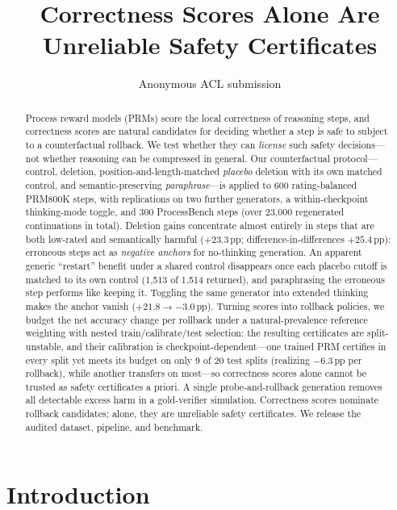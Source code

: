\documentclass[11pt]{article}
\title{Correctness Scores Alone Are Unreliable Safety Certificates}
\author{Anonymous ACL submission}
\begin{document}
\maketitle

\begin{abstract}
Process reward models (PRMs) score the local correctness of reasoning steps, and correctness scores are natural candidates for deciding whether a step is safe to subject to a counterfactual rollback. We test whether they can \emph{license} such safety decisions---not whether reasoning can be compressed in general. Our counterfactual protocol---control, deletion, position-and-length-matched \emph{placebo} deletion with its own matched control, and semantic-preserving \emph{paraphrase}---is applied to 600 rating-balanced PRM800K steps, with replications on two further generators, a within-checkpoint thinking-mode toggle, and 300 ProcessBench steps (over 23{,}000 regenerated continuations in total). Deletion gains concentrate almost entirely in steps that are both low-rated and semantically harmful ($+23.3$\,pp; difference-in-differences $+25.4$\,pp): erroneous steps act as \emph{negative anchors} for no-thinking generation. An apparent generic ``restart'' benefit under a shared control disappears once each placebo cutoff is matched to its own control (1{,}513 of 1{,}514 returned), and paraphrasing the erroneous step performs like keeping it. Toggling the same generator into extended thinking makes the anchor vanish ($+21.8 \to -3.0$\,pp). Turning scores into rollback policies, we budget the net accuracy change per rollback under a natural-prevalence reference weighting with nested train/calibrate/test selection: the resulting certificates are split-unstable, and their calibration is checkpoint-dependent---one trained PRM certifies in every split yet meets its budget on only 9 of 20 test splits (realizing $-6.3$\,pp per rollback), while another transfers on most---so correctness scores alone cannot be trusted as safety certificates a priori. A single probe-and-rollback generation removes all detectable excess harm in a gold-verifier simulation. Correctness scores nominate rollback candidates; alone, they are unreliable safety certificates. We release the audited dataset, pipeline, and benchmark.
\end{abstract}

\section{Introduction}
\end{document}
